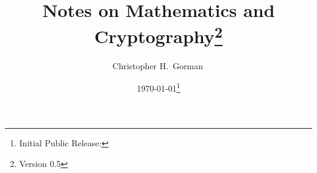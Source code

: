 
\newcommand*{\Author}[0]{Christopher H.~Gorman}
\newcommand*{\Title}[0]{Notes on Mathematics and Cryptography}






\author{\Author{}\,}
\title{\Title{}\thanks{Version 0.5}}
\date{\today\thanks{Initial Public Release: }}


